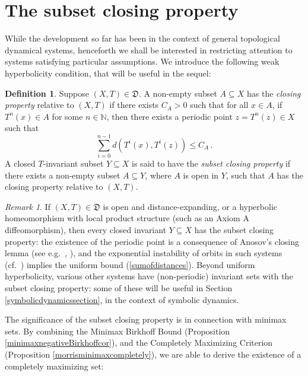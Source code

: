 \documentclass[reqno,11pt]{amsart}
\theoremstyle{definition}
\newtheorem{defn}[thm]{Definition}
\theoremstyle{remark}
\theoremstyle{remark}
\newtheorem{rem}[thm]{Remark}
\def \N {\mathbb N}
\def\D{\mathfrak{D}}
\numberwithin{equation}{section}
\begin{document}
\section{ The subset closing property}\label{closingpropertysection}

While the development so far has been in the context of general topological dynamical systems,
henceforth we shall be interested in restricting attention to systems satisfying particular assumptions.
We introduce the following weak hyperbolicity condition, that will be useful in the sequel: 

\begin{defn}\label{closingpropertydefn}
Suppose $(X,T)\in\D$.
A non-empty subset $A\subseteq X$ has the \emph{closing property} relative to $(X,T)$ if there exists $C_A>0$
such that for all $x\in A$, if $T^n(x)\in A$ for some $n\in\N$, then there exists a periodic point $z=T^n(z)\in X$ such that
\begin{equation}\label{sumofdistances}
\sum_{i=0}^{n-1} d\left(T^i(x), T^i(z)\right) \le C_A\,.
\end{equation}
A closed $T$-invariant subset $Y\subseteq X$ is said to have the \emph{subset closing property} if 
there exists a non-empty subset $A\subseteq Y$, where $A$ is open in $Y$,
such that $A$ has the closing property relative to $(X,T)$.
\end{defn}

\begin{rem}
If $(X,T)\in\D$ is open and distance-expanding, or a hyperbolic homeomorphism with local product structure
(such as an Axiom A diffeomorphism), then every closed invariant $Y\subseteq X$ has the subset closing property: 
the existence of the periodic point is a consequence of Anosov's closing lemma
(see e.g.~\cite[Thm.~6.4.15]{KH95}, \cite[Cor.~4.3.7]{URM22}), and the exponential instability of orbits
in such systems (cf.~\cite[Cor.~6.4.17]{KH95}) implies the uniform bound (\ref{sumofdistances}).
Beyond uniform hyperbolicity, various other systems have (non-periodic) invariant sets with the subset closing property: some of these will be useful in Section \ref{symbolicdynamicssection}, in the context of symbolic dynamics. 
\end{rem}


The significance of the subset closing property is in connection with minimax sets.
By combining the Minimax Birkhoff Bound (Proposition \ref{minimaxnegativeBirkhoffcor}),
and the Completely Maximizing Criterion (Proposition \ref{morrisminimaxcompletely}),
we are able to derive the existence of a completely maximizing set:
\end{document}
